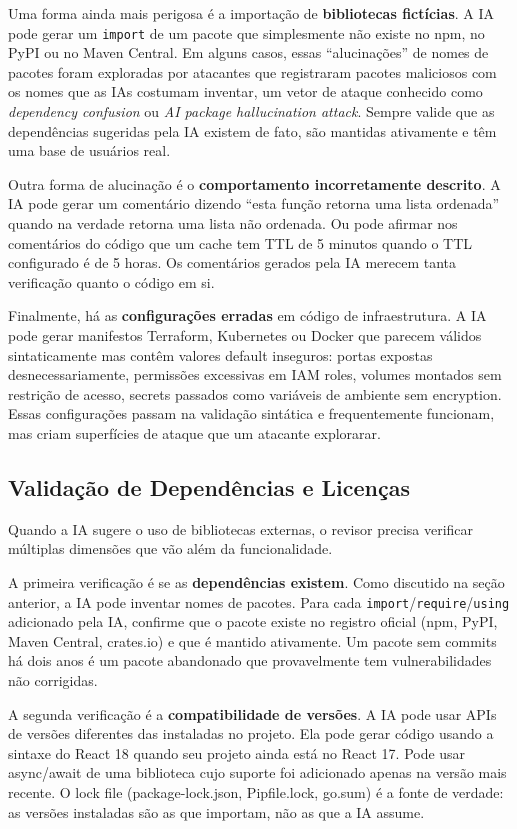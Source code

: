 Uma forma ainda mais perigosa é a importação de \textbf{bibliotecas fictícias}. A IA
pode gerar um \texttt{import} de um pacote que simplesmente não existe no npm, no
PyPI ou no Maven Central. Em alguns casos, essas ``alucinações'' de nomes de pacotes
foram exploradas por atacantes que registraram pacotes maliciosos com os nomes que
as IAs costumam inventar, um vetor de ataque conhecido como \textit{dependency
confusion} ou \textit{AI package hallucination attack}. Sempre valide que as
dependências sugeridas pela IA existem de fato, são mantidas ativamente e têm uma
base de usuários real.

Outra forma de alucinação é o \textbf{comportamento incorretamente descrito}. A IA
pode gerar um comentário dizendo ``esta função retorna uma lista ordenada'' quando na
verdade retorna uma lista não ordenada. Ou pode afirmar nos comentários do código que
um cache tem TTL de 5 minutos quando o TTL configurado é de 5 horas. Os comentários
gerados pela IA merecem tanta verificação quanto o código em si.

Finalmente, há as \textbf{configurações erradas} em código de infraestrutura. A IA
pode gerar manifestos Terraform, Kubernetes ou Docker que parecem válidos
sintaticamente mas contêm valores default inseguros: portas expostas desnecessariamente,
permissões excessivas em IAM roles, volumes montados sem restrição de acesso, secrets
passados como variáveis de ambiente sem encryption. Essas configurações passam na
validação sintática e frequentemente funcionam, mas criam superfícies de ataque que
um atacante explorarar.

\subsection{Validação de Dependências e Licenças}

Quando a IA sugere o uso de bibliotecas externas, o revisor precisa verificar
múltiplas dimensões que vão além da funcionalidade.

A primeira verificação é se as \textbf{dependências existem}. Como discutido na
seção anterior, a IA pode inventar nomes de pacotes. Para cada
\texttt{import}/\texttt{require}/\texttt{using} adicionado pela IA, confirme que
o pacote existe no registro oficial (npm, PyPI, Maven Central, crates.io) e que é
mantido ativamente. Um pacote sem commits há dois anos é um pacote abandonado que
provavelmente tem vulnerabilidades não corrigidas.

A segunda verificação é a \textbf{compatibilidade de versões}. A IA pode usar APIs
de versões diferentes das instaladas no projeto. Ela pode gerar código usando a
sintaxe do React 18 quando seu projeto ainda está no React 17. Pode usar async/await
de uma biblioteca cujo suporte foi adicionado apenas na versão mais recente. O lock
file (package-lock.json, Pipfile.lock, go.sum) é a fonte de verdade: as versões
instaladas são as que importam, não as que a IA assume.

